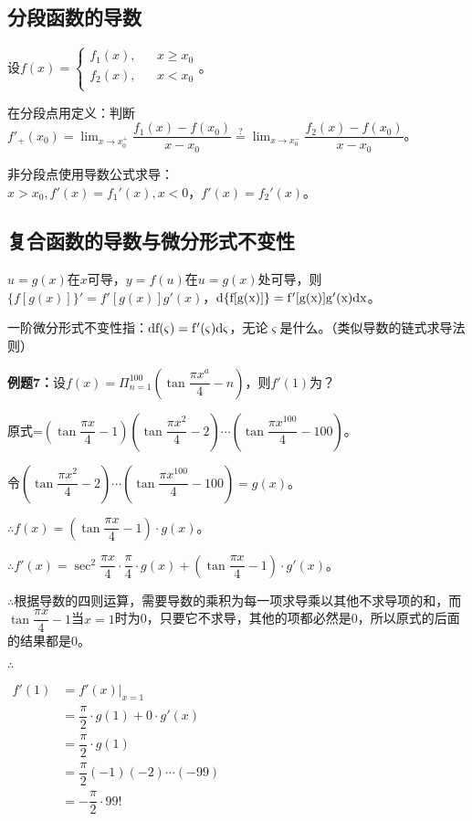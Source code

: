 \documentclass[UTF8, 12pt]{ctexart}
\begin{document}
\subsection{分段函数的导数}

设$f(x)=\left\{
    \begin{array}{lcl}
        f_1(x), & & x\geqslant x_0 \\
        f_2(x), & & x<x_0 \\
    \end{array}
\right.$。

在分段点用定义：判断$f'_+(x_0)=\lim_{x\to x_0^+}\dfrac{f_1(x)-f(x_0)}{x-x_0}\overset{?}{=}\lim_{x\to x_0^-}\dfrac{f_2(x)-f(x_0)}{x-x_0}$。

非分段点使用导数公式求导：$x>x_0,f'(x)=f_1'(x),x<0，f'(x)=f_2'(x)$。

\subsection{复合函数的导数与微分形式不变性}

$u=g(x)$在$x$可导，$y=f(u)$在$u=g(x)$处可导，则$\{f[g(x)]\}'=f'[g(x)]g'(x)$，$\rm{d}\{f[g(x)]\}=f'[g(x)]g'(x)\rm{d}x$。

一阶微分形式不变性指：$\rm{d}f(\varsigma)=f'(\varsigma)\rm{d}\varsigma$，无论$\varsigma$是什么。（类似导数的链式求导法则）

\textbf{例题7：}设$f(x)=\Pi_{n=1}^{100}\left(\tan\dfrac{\pi x^a}{4}-n\right)$，则$f'(1)$为？

原式=$\left(\tan\dfrac{\pi x}{4}-1\right)\left(\tan\dfrac{\pi x^2}{4}-2\right)\cdots\left(\tan\dfrac{\pi x^100}{4}-100\right)$。

令$\left(\tan\dfrac{\pi x^2}{4}-2\right)\cdots\left(\tan\dfrac{\pi x^100}{4}-100\right)=g(x)$。

$\therefore f(x)=\left(\tan\dfrac{\pi x}{4}-1\right)\cdot g(x)$。

$\therefore f'(x)=\sec^2\dfrac{\pi x}{4}\cdot\dfrac{\pi}{4}\cdot g(x)+\left(\tan\dfrac{\pi x}{4}-1\right)\cdot g'(x)$。

$\therefore$根据导数的四则运算，需要导数的乘积为每一项求导乘以其他不求导项的和，而$\tan\dfrac{\pi x}{4}-1$当$x=1$时为0，只要它不求导，其他的项都必然是0，所以原式的后面的结果都是0。

$\therefore$

$
\begin{aligned}
    f'(1) & =f'(x)\vert_{x=1} \\
    & =\dfrac{\pi}{2}\cdot g(1)+0\cdot g'(x) \\
    & =\dfrac{\pi}{2}\cdot g(1) \\
    & =\dfrac{\pi}{2}(-1)(-2)\cdots(-99) \\
    & =-\dfrac{\pi}{2}\cdot 99!
\end{aligned}
$
\end{document}
